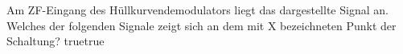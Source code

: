     {Am ZF-Eingang des Hüllkurvendemodulators liegt das dargestellte Signal an. Welches der folgenden Signale zeigt sich an dem mit X bezeichneten Punkt der Schaltung?}
    {}
    {}
    {}
    {}
    {true}{true}